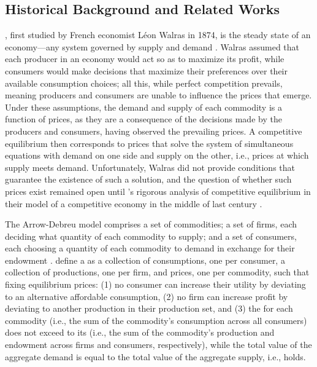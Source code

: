 \subsection{Historical Background and Related Works}

 \cite{arrow-debreu,walras}, first studied by French economist L\'eon Walras in 1874, is the steady state of an economy---any 
system governed by supply and demand \cite{walras}.
Walras assumed that each producer in an economy would act so as to maximize its profit, while consumers would make decisions that maximize their preferences over their available consumption choices; all this, while perfect competition prevails, meaning producers and consumers are unable to influence the prices that emerge.
Under these assumptions, the demand and supply of each commodity is a function of prices, as they are a consequence of the decisions made by the producers and consumers, having observed the prevailing prices.
A competitive equilibrium then corresponds to prices that solve the system of simultaneous equations with demand on one side and supply on the other, i.e., prices at which supply meets demand.
Unfortunately, Walras did not provide conditions that guarantee the existence of such a solution, and the question of whether such prices exist remained open until \citeauthor{arrow-debreu}'s rigorous analysis of competitive equilibrium in their model of a competitive economy in the middle of last century \cite{arrow-debreu}.

The Arrow-Debreu model comprises a set of commodities; a set of firms, each deciding what quantity of each commodity to supply; and a set of consumers, each choosing a quantity of each commodity to demand in exchange for their endowment \cite{arrow-debreu}. 
\citeauthor{arrow-debreu} define a  as a collection of consumptions, one per consumer, a collection of productions, one per firm, and prices, one per commodity, such that fixing equilibrium prices: (1) no consumer can increase their utility by deviating to an alternative affordable consumption, (2) no firm can increase profit by deviating to another production in their production set, and (3) the  for each commodity (i.e., the sum of the commodity's consumption across all consumers) does not exceed to its  (i.e., the sum of the commodity's production and endowment across firms and consumers, respectively), while the total value of the aggregate demand is equal to the total value of the aggregate supply, i.e.,  holds.


